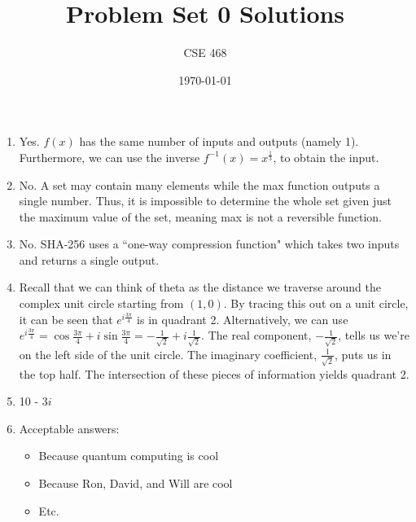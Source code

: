\documentclass[12pt]{article}
\title{Problem Set 0 Solutions}
\author{CSE 468}
\date{\today}
\begin{document}
\maketitle

\begin{enumerate}[font=\bfseries]
    \item Yes. $f(x)$ has the same number of inputs and outputs (namely 1). Furthermore, we can use the inverse $f^{-1}(x) = x^{\frac{1}{3}}$, to obtain the input.
    \item No. A set may contain many elements while the max function outputs a single number. Thus, it is impossible to determine the whole set given just the maximum value of the set, meaning max is not a reversible function.
    \item No. SHA-256 uses a ``one-way compression function" which takes two inputs and returns a single output.
    \item Recall that we can think of theta as the distance we traverse around the complex unit circle starting from $(1,0)$. By tracing this out on a unit circle, it can be seen that $e^{i\frac{3\pi}{4}}$ is in quadrant 2.
    Alternatively, we can use $e^{i\frac{3\pi}{4}} = \cos{\frac{3\pi}{4}}+i\sin{\frac{3\pi}{4}} = -\frac{1}{\sqrt{2}}+i\frac{1}{\sqrt{2}}$.
    The real component, $-\frac{1}{\sqrt{2}}$, tells us we're on the left side of the unit circle. The imaginary coefficient, $\frac{1}{\sqrt{2}}$, puts us in the top half. The intersection of these pieces of information yields quadrant 2.
    \item 10 - 3$i$
    \item Acceptable answers:
        \begin{itemize}
            \item Because quantum computing is cool
            \item Because Ron, David, and Will are cool
            \item Etc.
        \end{itemize}
\end{enumerate}
\end{document}
